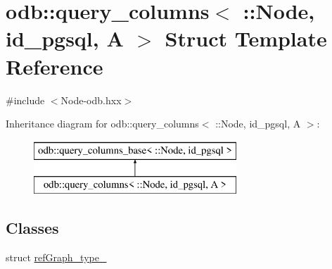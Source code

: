 \hypertarget{structodb_1_1query__columns_3_01_1_1_node_00_01id__pgsql_00_01_a_01_4}{}\section{odb\+:\+:query\+\_\+columns$<$ \+:\+:Node, id\+\_\+pgsql, A $>$ Struct Template Reference}
\label{structodb_1_1query__columns_3_01_1_1_node_00_01id__pgsql_00_01_a_01_4}


{\ttfamily \#include $<$Node-\/odb.\+hxx$>$}

Inheritance diagram for odb\+:\+:query\+\_\+columns$<$ \+:\+:Node, id\+\_\+pgsql, A $>$\+:\begin{figure}[H]
\begin{center}
\leavevmode
\includegraphics[height=2.000000cm]{d0/d59/structodb_1_1query__columns_3_01_1_1_node_00_01id__pgsql_00_01_a_01_4}
\end{center}
\end{figure}
\subsection*{Classes}
\begin{DoxyCompactItemize}
\item 
struct \hyperlink{structodb_1_1query__columns_3_01_1_1_node_00_01id__pgsql_00_01_a_01_4_1_1ref_graph__type__}{ref\+Graph\+\_\+type\+\_\+}
\end{DoxyCompactItemize}
